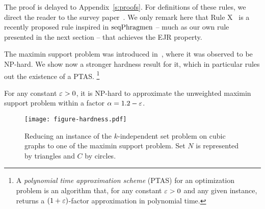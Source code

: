 The proof is delayed to Appendix~\ref{s:proofs}. 
For definitions of these rules, we direct the reader to the survey paper~\cite{lackner2020approval}.
We only remark here that Rule X~\cite{peters2019proportionality} is a recently proposed rule inspired in $\operatorname{seqPhragmen}$ -- much as our own rule presented in the next section -- that achieves the EJR property. 

The maximin support problem was introduced in~\cite{sanchez2016maximin}, where it was observed to be NP-hard. We show now a stronger hardness result for it, which in particular rules out the existence of a PTAS.%
\footnote{A \emph{polynomial time approximation scheme} (PTAS) for an optimization problem is an algorithm that, for any constant $\varepsilon>0$ and any given instance, returns a $(1+\varepsilon)$-factor approximation in polynomial time.} 


\begin{theorem}
For any constant $\varepsilon>0$, it is NP-hard to approximate the unweighted maximin support problem within a factor $\alpha=1.2-\varepsilon$.
\end{theorem}

\begin{figure}[htb]
  \centering
	\texttt{[image: figure-hardness.pdf]}
  \caption{Reducing an instance of the $k$-independent set problem on cubic graphs to one of the maximin support problem. Set $N$ is represented by triangles and $C$ by circles.}
  \label{fig:hardness}
\end{figure}

